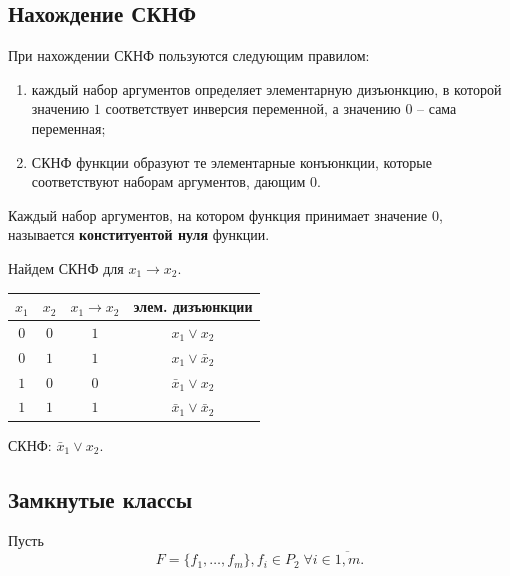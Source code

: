 \subsection{Нахождение СКНФ}

\noindent При нахождении СКНФ пользуются следующим правилом:
\begin{enumerate}
    \item каждый набор аргументов определяет элементарную дизъюнкцию, в которой значению \(1\) соответствует инверсия переменной, а значению \(0\) -- сама переменная;
    \item СКНФ функции образуют те элементарные конъюнкции, которые соответствуют наборам аргументов, дающим \(0\).
\end{enumerate}

Каждый набор аргументов, на котором функция принимает значение \(0\), называется \textbf{конституентой нуля} функции.

\begin{example}
    Найдем СКНФ для \(x_1 \to x_2\).

        {
            \renewcommand{\arraystretch}{1.5}
            \begin{longtable}{|c|c|c|c|}
                \hline
                \(x_1\) & \(x_2\) & \(x_1 \to x_2\) & элем. дизъюнкции             \\
                \hline
                \(0\)   & \(0\)   & \(1\)           & \(x_1 \lor x_2\)             \\
                \hline
                \(0\)   & \(1\)   & \(1\)           & \(x_1 \lor \bar{x}_2\)       \\
                \hline
                \(1\)   & \(0\)   & \(0\)           & \(\bar{x}_1 \lor x_2\)       \\
                \hline
                \(1\)   & \(1\)   & \(1\)           & \(\bar{x}_1 \lor \bar{x}_2\) \\
                \hline
            \end{longtable}
        }

    СКНФ: \(\bar{x}_1 \lor x_2\).
\end{example}

\subsection{Замкнутые классы}

Пусть
\[
    F = \{f_1, \ldots, f_m\}, f_i \in P_2 \; \forall i \in \overline{1, m}.
\]

